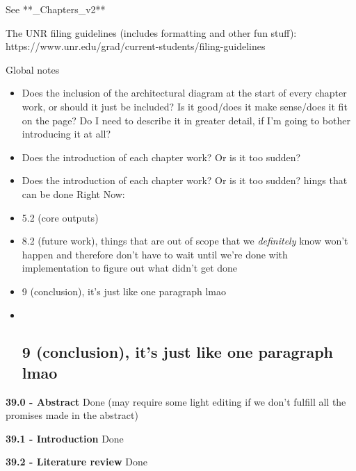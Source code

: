 See **\_Chapters\_v2**

The UNR filing guidelines (includes formatting and other fun stuff):
https://www.unr.edu/grad/current-students/filing-guidelines

Global notes

\begin{itemize}
\item
  Does the inclusion of the architectural diagram at the start of every
  chapter work, or should it just be included? Is it good/does it make
  sense/does it fit on the page? Do I need to describe it in greater
  detail, if I'm going to bother introducing it at all?
\item
  Does the introduction of each chapter work? Or is it too sudden?
\item
  Does the introduction of each chapter work? Or is it too sudden? hings
  that can be done Right Now:
\item
  5.2 (core outputs)
\item
  8.2 (future work), things that are out of scope that we
  \emph{definitely} know won't happen and therefore don't have to wait
  until we're done with implementation to figure out what didn't get
  done
\item
  9 (conclusion), it's just like one paragraph lmao
\item ~
  \subsection{9 (conclusion), it's just like one paragraph
  lmao}\label{conclusion-its-just-like-one-paragraph-lmao}
\end{itemize}

\textbf{39.0 - Abstract} Done (may require some light editing if we
don't fulfill all the promises made in the abstract)

\textbf{39.1 - Introduction} Done

\textbf{39.2 - Literature review} Done

